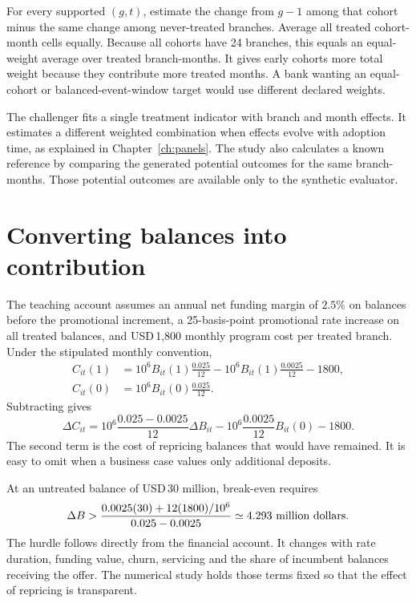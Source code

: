 For every supported $(g,t)$, estimate the change from $g-1$ among that
cohort minus the same change among never-treated branches. Average all
treated cohort-month cells equally. Because all cohorts have 24 branches,
this equals an equal-weight average over treated branch-months. It gives
early cohorts more total weight because they contribute more treated
months. A bank wanting an equal-cohort or balanced-event-window target
would use different declared weights.

The challenger fits a single treatment indicator with branch and month
effects. It estimates a different weighted combination when effects evolve
with adoption time, as explained in Chapter~\ref{ch:panels}. The study
also calculates a known reference by comparing the generated potential
outcomes for the same branch-months. Those potential outcomes are available
only to the synthetic evaluator.

\section{Converting balances into contribution}
The teaching account assumes an annual net funding margin of $2.5\%$
on balances before the promotional increment, a 25-basis-point promotional
rate increase on all treated balances, and USD\,1,800 monthly program
cost per treated branch. Under the stipulated monthly convention,
\begin{align}
 C_{it}(1)&=10^6 B_{it}(1)\frac{0.025}{12}
           -10^6 B_{it}(1)\frac{0.0025}{12}-1800,\\
 C_{it}(0)&=10^6 B_{it}(0)\frac{0.025}{12}.
 \label{eq:deposit-cash}
\end{align}
Subtracting gives
\begin{equation}
 \Delta C_{it}=10^6\frac{0.025-0.0025}{12}\Delta B_{it}
       -10^6\frac{0.0025}{12}B_{it}(0)-1800.
 \label{eq:deposit-hurdle}
\end{equation}
The second term is the cost of repricing balances that would have remained.
It is easy to omit when a business case values only additional deposits.

At an untreated balance of USD\,30 million, break-even requires
\[
 \Delta B>
 \frac{0.0025(30)+12(1800)/10^6}{0.025-0.0025}
 \simeq 4.293\ \hbox{million dollars}.
\]
The hurdle follows directly from the financial account. It changes with
rate duration, funding value, churn, servicing and the share of incumbent
balances receiving the offer. The numerical study holds those terms fixed
so that the effect of repricing is transparent.

